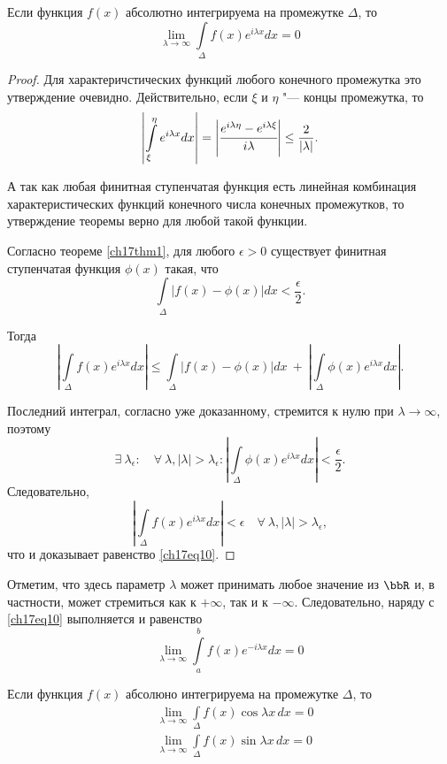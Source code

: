 \begin{thm} \label{ch17thm2}
Если функция $f(x)$ абсолютно интегрируема на промежутке $\Delta$, то
\begin{equation} \label{ch17eq10}
\lim_{\lambda \to \infty}\int\limits_{\Delta} f(x)e^{i\lambda x}dx = 0
\end{equation}
\end{thm}
\begin{proof}
Для характеричстических функций любого конечного промежутка это утверждение очевидно. Действительно, если $\xi$ и $\eta$ "--- концы промежутка, то
$$
\left|\int\limits_{\xi}^{\eta} e^{i\lambda x}dx\right| = \left|\cfrac{e^{i\lambda \eta} - e^{i\lambda \xi}}{i\lambda}\right| \le \frac{2}{|\lambda|}.
$$

А так как любая финитная ступенчатая функция есть линейная комбинация характеристических функций конечного числа конечных промежутков, то утверждение теоремы верно для любой такой функции.

Согласно теореме \ref{ch17thm1}, для любого $\epsilon > 0$ существует финитная ступенчатая функция $\phi(x)$ такая, что
$$
\int\limits_{\Delta} |f(x) - \phi(x)|dx < \frac{\epsilon}{2}.
$$

Тогда
$$
\left|\int\limits_{\Delta} f(x)e^{i\lambda x}dx\right| \le \int\limits_{\Delta} |f(x) - \phi(x)|dx\ +\ \left|\int\limits_{\Delta} \phi(x)e^{i\lambda x}dx\right|.
$$

Последний интеграл, согласно уже доказанному, стремится к нулю при $\lambda \to \infty$, поэтому
$$
\exists\ \lambda_{\epsilon} : \quad \forall\ \lambda, |\lambda| > \lambda_{\epsilon} : \left|\int\limits_{\Delta} \phi(x)e^{i\lambda x}dx\right| < \frac{\epsilon}{2}.
$$
Следовательно,
$$
\left|\int\limits_{\Delta} f(x)e^{i\lambda x}dx\right| < \epsilon \quad \forall\ \lambda, |\lambda| > \lambda_{\epsilon},
$$
что и доказывает равенство \eqref{ch17eq10}.
\end{proof}

Отметим, что здесь параметр $\lambda$ может принимать любое значение из $\bbR$ и, в частности, может стремиться как к $+\infty$, так и к $-\infty$. Следовательно, наряду с \eqref{ch17eq10} выполняется и равенство
$$
\lim_{\lambda \to \infty}\int\limits_{a}^{b} f(x)e^{-i\lambda x}dx = 0
$$

\begin{cons}
Если функция $f(x)$ абсолюно интегрируема на промежутке $\Delta$, то
\begin{align*}
&\lim_{\lambda \to \infty}\int\limits_{\Delta} f(x)\cos{\lambda x}\,dx = 0\\
&\lim_{\lambda \to \infty}\int\limits_{\Delta} f(x)\sin{\lambda x}\,dx = 0
\end{align*}
\end{cons}

